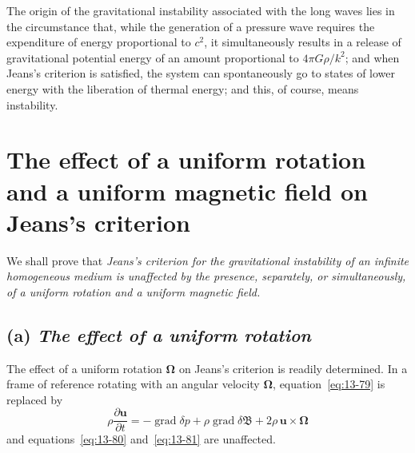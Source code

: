 The origin of the gravitational instability associated with the long waves lies in the circumstance that, while the generation of a pressure wave requires the expenditure of energy proportional to $c^2$, it simultaneously results in a release of gravitational potential energy of an amount proportional to $4\pi G\rho/k^2$; and when Jeans's criterion is satisfied, the system can spontaneously go to states of lower energy with the liberation of thermal energy; and this, of course, means instability.

\section{The effect of a uniform rotation and a uniform magnetic field on Jeans's criterion}
\label{sec:120}

We shall prove that \textit{Jeans's criterion for the gravitational instability of an infinite homogeneous medium is unaffected by the presence, separately, or simultaneously, of a uniform rotation and a uniform magnetic field.}

\subsection*{(a) \textit{The effect of a uniform rotation}}

The effect of a uniform rotation $\boldsymbol{\Omega}$ on Jeans's criterion is readily determined. In a frame of reference rotating with an angular velocity $\boldsymbol{\Omega}$, equation~\eqref{eq:13-79} is replaced by
\begin{equation}
\label{eq:13-90}
\rho\frac{\partial\mathbf{u}}{\partial t} = -\operatorname{grad}\delta p + \rho\operatorname{grad}\delta\mathfrak{B} + 2\rho\,\mathbf{u}\times\boldsymbol{\Omega}
\end{equation}
and equations~\eqref{eq:13-80} and~\eqref{eq:13-81} are unaffected.

